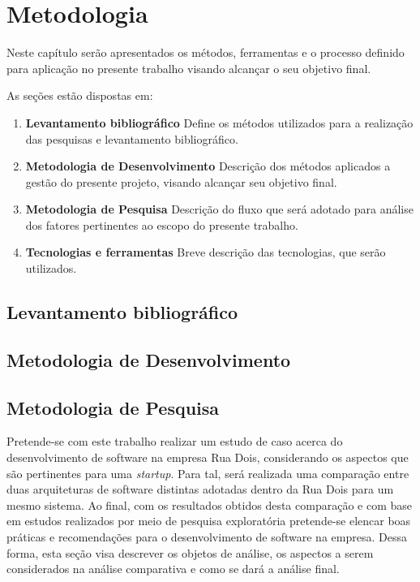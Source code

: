 \chapter{Metodologia}
\label{sec:Metodologia}

Neste capítulo serão apresentados os métodos, ferramentas e o processo definido
para aplicação no presente trabalho visando alcançar o seu objetivo final.

  As seções estão dispostas em:

  \begin{enumerate}
    \item \textbf{Levantamento bibliográfico} Define os métodos utilizados para
    a realização das pesquisas e levantamento bibliográfico.
    \item \textbf{Metodologia de Desenvolvimento} Descrição dos métodos
    aplicados a gestão do presente projeto, visando alcançar seu objetivo final.
    \item \textbf{Metodologia de Pesquisa} Descrição do fluxo que será
    adotado para análise dos fatores pertinentes ao escopo do presente trabalho.
    \item \textbf{Tecnologias e ferramentas} Breve descrição das tecnologias,
    que serão utilizados.
  \end{enumerate}

\section{Levantamento bibliográfico}
\section{Metodologia de Desenvolvimento}
\section{Metodologia de Pesquisa}

Pretende-se com este trabalho realizar um estudo de caso acerca do desenvolvimento
de software na empresa Rua Dois, considerando os aspectos que são pertinentes para
uma \textit{startup}. Para tal, será realizada uma comparação entre duas arquiteturas
de software distintas adotadas dentro da Rua Dois para um mesmo sistema. Ao final,
com os resultados obtidos desta comparação e com base em estudos realizados por meio
de pesquisa exploratória pretende-se elencar boas práticas e recomendações para o
desenvolvimento de software na empresa. Dessa forma, esta seção visa descrever
os objetos de análise, os aspectos a serem considerados na análise comparativa e
como se dará a análise final.

